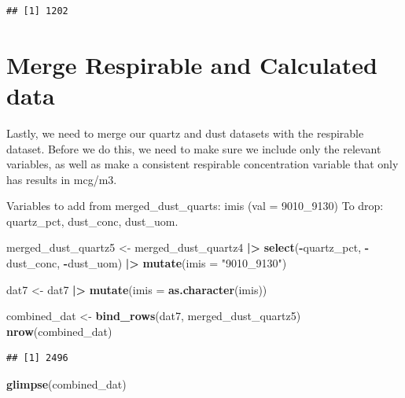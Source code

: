 \documentclass[
]{article}
\newenvironment{Shaded}{\begin{snugshade}}{\end{snugshade}}
\newcommand{\AttributeTok}[1]{\textcolor[rgb]{0.13,0.29,0.53}{#1}}
\newcommand{\FunctionTok}[1]{\textcolor[rgb]{0.13,0.29,0.53}{\textbf{#1}}}
\newcommand{\NormalTok}[1]{#1}
\newcommand{\OtherTok}[1]{\textcolor[rgb]{0.56,0.35,0.01}{#1}}
\newcommand{\SpecialCharTok}[1]{\textcolor[rgb]{0.81,0.36,0.00}{\textbf{#1}}}
\newcommand{\StringTok}[1]{\textcolor[rgb]{0.31,0.60,0.02}{#1}}
\begin{document}
\begin{verbatim}
## [1] 1202
\end{verbatim}

\section{Merge Respirable and Calculated
data}\label{merge-respirable-and-calculated-data}

Lastly, we need to merge our quartz and dust datasets with the
respirable dataset. Before we do this, we need to make sure we include
only the relevant variables, as well as make a consistent respirable
concentration variable that only has results in mcg/m3.

Variables to add from merged\_dust\_quarts: imis (val = 9010\_9130) To
drop: quartz\_pct, dust\_conc, dust\_uom.

\begin{Shaded}
\begin{Highlighting}[]
\NormalTok{merged\_dust\_quartz5 }\OtherTok{\textless{}{-}}\NormalTok{ merged\_dust\_quartz4 }\SpecialCharTok{|\textgreater{}} 
  \FunctionTok{select}\NormalTok{(}\SpecialCharTok{{-}}\NormalTok{quartz\_pct, }\SpecialCharTok{{-}}\NormalTok{dust\_conc, }\SpecialCharTok{{-}}\NormalTok{dust\_uom) }\SpecialCharTok{|\textgreater{}} 
  \FunctionTok{mutate}\NormalTok{(}\AttributeTok{imis =} \StringTok{"9010\_9130"}\NormalTok{) }

\NormalTok{dat7 }\OtherTok{\textless{}{-}}\NormalTok{ dat7 }\SpecialCharTok{|\textgreater{}} 
  \FunctionTok{mutate}\NormalTok{(}\AttributeTok{imis =} \FunctionTok{as.character}\NormalTok{(imis))}
\end{Highlighting}
\end{Shaded}

\begin{Shaded}
\begin{Highlighting}[]
\NormalTok{combined\_dat }\OtherTok{\textless{}{-}} \FunctionTok{bind\_rows}\NormalTok{(dat7, merged\_dust\_quartz5)}
\FunctionTok{nrow}\NormalTok{(combined\_dat) }
\end{Highlighting}
\end{Shaded}

\begin{verbatim}
## [1] 2496
\end{verbatim}

\begin{Shaded}
\begin{Highlighting}[]
\FunctionTok{glimpse}\NormalTok{(combined\_dat) }
\end{Highlighting}
\end{Shaded}
\end{document}
